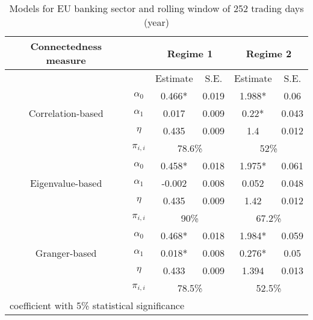 \documentclass{article}
\begin{document}
\begin{table}
  \begin{center}
  \caption{Models for EU banking sector and rolling window of 252 trading days (year)}
  \label{table:eu}
  \begin{tabular}{cccccc}
    \toprule
     Connectedness measure &  & \multicolumn{2}{c}{\bfseries Regime 1} & \multicolumn{2}{c}{\bfseries Regime 2}  \\
     \hline
     & & Estimate & S.E. & Estimate & S.E. \\
     \hline
     \multirow{3}{*}[\normalbaselineskip]{Correlation-based} & $\alpha_0$ & 0.466* & 0.019 & 1.988*  & 0.06 \\
      & $\alpha_1$ & 0.017 & 0.009 & 0.22* & 0.043 \\
      & $\eta$ & 0.435 & 0.009 & 1.4 & 0.012 \\
      & $\pi_{i,i}$ &  \multicolumn{2}{c}{78.6\%} & \multicolumn{2}{c}{52\%}\\
      \hline
      \multirow{3}{*}[\normalbaselineskip]{Eigenvalue-based} & $\alpha_0$ & 0.458* & 0.018 & 1.975*  & 0.061 \\
      & $\alpha_1$ & -0.002 & 0.008 & 0.052 & 0.048 \\
      & $\eta$ & 0.435 & 0.009 & 1.42 & 0.012 \\
      & $\pi_{i,i}$ &  \multicolumn{2}{c}{90\%} & \multicolumn{2}{c}{67.2\%}\\
      \hline
      \multirow{3}{*}[\normalbaselineskip]{Granger-based} & $\alpha_0$ & 0.468* & 0.018 & 1.984*  & 0.059 \\
      & $\alpha_1$ & 0.018* & 0.008 & 0.276* & 0.05 \\
      & $\eta$ & 0.433 & 0.009 & 1.394 & 0.013 \\
      & $\pi_{i,i}$ &  \multicolumn{2}{c}{78.5\%} & \multicolumn{2}{c}{52.5\%}\\
      \hline
    \multicolumn{6}{l}{\footnotesize * coefficient with 5\% statistical significance} \\
    \hline
  \end{tabular}
\end{center}

\end{table}


\newpage


\end{document}
